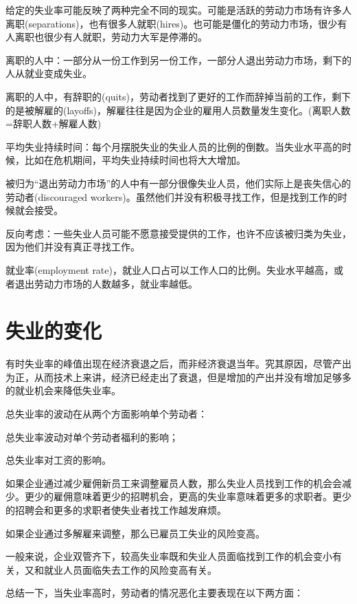 \documentclass{article}
\begin{document}
给定的失业率可能反映了两种完全不同的现实。可能是活跃的劳动力市场有许多人离职(separations)，也有很多人就职(hires)。也可能是僵化的劳动力市场，很少有人离职也很少有人就职，劳动力大军是停滞的。

离职的人中：一部分从一份工作到另一份工作，一部分人退出劳动力市场，剩下的人从就业变成失业。

离职的人中，有辞职的(quits)，劳动者找到了更好的工作而辞掉当前的工作，剩下的是被解雇的(layoffs)，解雇往往是因为企业的雇用人员数量发生变化。(离职人数=辞职人数+解雇人数)

平均失业持续时间：每个月摆脱失业的失业人员的比例的倒数。当失业水平高的时候，比如在危机期间，平均失业持续时间也将大大增加。

被归为“退出劳动力市场”的人中有一部分很像失业人员，他们实际上是丧失信心的劳动者(discouraged workers)。虽然他们并没有积极寻找工作，但是找到工作的时候就会接受。

反向考虑：一些失业人员可能不愿意接受提供的工作，也许不应该被归类为失业，因为他们并没有真正寻找工作。

就业率(employment rate)，就业人口占可以工作人口的比例。失业水平越高，或者退出劳动力市场的人数越多，就业率越低。

\section{失业的变化}

有时失业率的峰值出现在经济衰退之后，而非经济衰退当年。究其原因，尽管产出为正，从而技术上来讲，经济已经走出了衰退，但是增加的产出并没有增加足够多的就业机会来降低失业率。

\hspace*{\fill}

总失业率的波动在从两个方面影响单个劳动者：

总失业率波动对单个劳动者福利的影响；

总失业率对工资的影响。

如果企业通过减少雇佣新员工来调整雇员人数，那么失业人员找到工作的机会会减少。更少的雇佣意味着更少的招聘机会，更高的失业率意味着更多的求职者。更少的招聘会和更多的求职者使失业者找工作越发麻烦。

如果企业通过多解雇来调整，那么已雇员工失业的风险变高。

一般来说，企业双管齐下，较高失业率既和失业人员面临找到工作的机会变小有关，又和就业人员面临失去工作的风险变高有关。

\hspace*{\fill}

总结一下，当失业率高时，劳动者的情况恶化主要表现在以下两方面：
\end{document}
